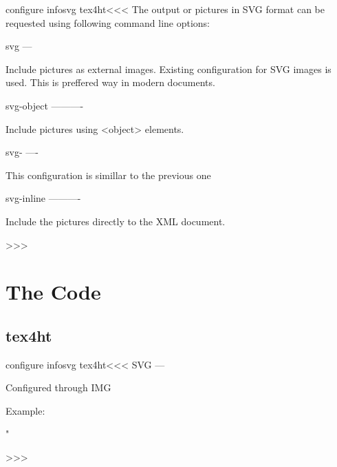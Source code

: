 \<configure infosvg tex4ht\><<<
The output or pictures in SVG format can be requested using following command
line options:

svg
---

Include pictures as external images. Existing configuration for SVG images is 
used. This is preffered way in modern documents.

svg-object
----------

Include pictures using <object> elements.

svg-
----

This configuration is simillar to the previous one

svg-inline
----------

Include the pictures directly to the XML document.

>>>



\chapter{The Code}

\section{tex4ht}

\<configure infosvg tex4ht\><<<
SVG
---

 Configured through IMG

  Example:
      {}
      {}
      {" }
      {}
      {}
>>>




 
 
\endinput


